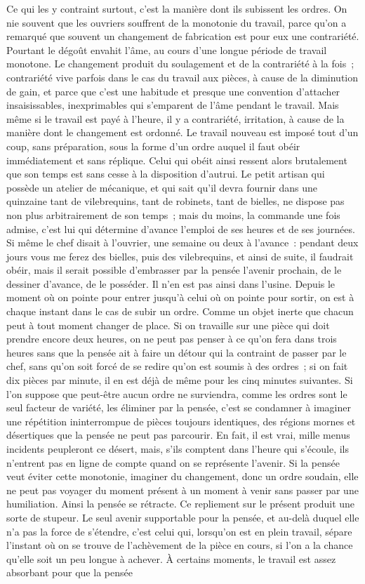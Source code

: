 \documentclass[french,twoside]{book} %
\begin{document}
Ce qui les y contraint surtout, c'est la manière dont ils subissent les ordres. On nie souvent que les ouvriers souffrent de la monotonie du travail, parce qu'on a remarqué que souvent un changement de fabrication est pour eux une contrariété. Pourtant le dégoût envahit l'âme, au cours d'une longue période de travail monotone. Le changement produit du soulagement et de la contrariété à la fois ; contrariété vive parfois dans le cas du travail aux pièces, à cause de la diminution de gain, et parce que c'est une habitude et presque une convention d'attacher insaisissables, inexprimables qui s'emparent de l'âme pendant le travail. Mais même si le travail est payé à l'heure, il y a contrariété, irritation, à cause de la manière dont le changement est ordonné. Le travail nouveau est imposé tout d'un coup, sans préparation, sous la forme d'un ordre auquel il faut obéir immédiatement et sans réplique. Celui qui obéit ainsi ressent alors brutalement que son temps est sans cesse à la disposition d'autrui. Le petit artisan qui possède un atelier de mécanique, et qui sait qu'il devra fournir dans une quinzaine tant de vilebrequins, tant de robinets, tant de bielles, ne dispose pas non plus arbitrairement de son temps ; mais du moins, la commande une fois admise, c'est lui qui détermine d'avance l'emploi de ses heures et de ses journées. Si même le chef disait à l'ouvrier, une semaine ou deux à l'avance : pendant deux jours vous me ferez des bielles, puis des vilebrequins, et ainsi de suite, il faudrait obéir, mais il serait possible d'embrasser par la pensée l'avenir prochain, de le dessiner d'avance, de le posséder. Il n'en est pas ainsi dans l'usine. Depuis le moment où on pointe pour entrer jusqu'à celui où on pointe pour sortir, on est à chaque instant dans le cas de subir un ordre. Comme un objet inerte que chacun peut à tout moment changer de place. Si on travaille sur une pièce qui doit prendre encore deux heures, on ne peut pas penser à ce qu'on fera dans trois heures sans que la pensée ait à faire un détour qui la contraint de passer par le chef, sans qu'on soit forcé de se redire qu'on est soumis à des ordres ; si on fait dix pièces par minute, il en est déjà de même pour les cinq minutes suivantes. Si l'on suppose que peut-être aucun ordre ne surviendra, comme les ordres sont le seul facteur de variété, les éliminer par la pensée, c'est se condamner à imaginer une répétition ininterrompue de pièces toujours identiques, des régions mornes et désertiques que la pensée ne peut pas parcourir. En fait, il est vrai, mille menus incidents peupleront ce désert, mais, s'ils comptent dans l'heure qui s'écoule, ils n'entrent pas en ligne de compte quand on se représente l'avenir. Si la pensée veut éviter cette monotonie, imaginer du changement, donc un ordre soudain, elle ne peut pas voyager du moment présent à un moment à venir sans passer par une humiliation. Ainsi la pensée se rétracte. Ce repliement sur le présent produit une sorte de stupeur. Le seul avenir supportable pour la pensée, et au-delà duquel elle n'a pas la force de s'étendre, c'est celui qui, lorsqu'on est en plein travail, sépare l'instant où on se trouve de l'achèvement de la pièce en cours, si l'on a la chance qu'elle soit un peu longue à achever. À certains moments, le travail est assez absorbant pour que la pensée 
\end{document}
